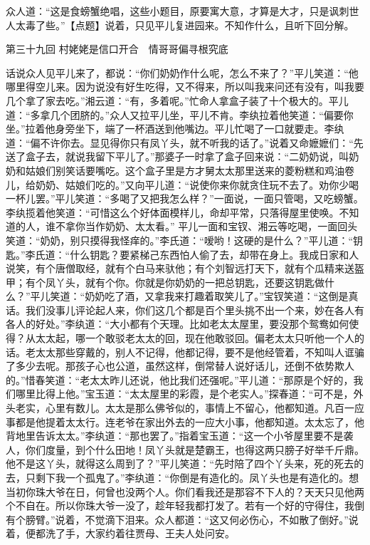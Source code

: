 \documentclass[12pt,oneside]{book}
\begin{document}
众人道：“这是食螃蟹绝唱，这些小题目，原要寓大意，才算是大才，只是讽刺世人太毒了些。”【点题】说着，只见平儿复进园来。不知作什么，且听下回分解。


 
第三十九回  村姥姥是信口开合　情哥哥偏寻根究底


话说众人见平儿来了，都说：“你们奶奶作什么呢，怎么不来了？”平儿笑道：“他哪里得空儿来。因为说没有好生吃得，又不得来，所以叫我来问还有没有，叫我要几个拿了家去吃。”湘云道：“有，多着呢。”忙命人拿盒子装了十个极大的。平儿道：“多拿几个团脐的。”众人又拉平儿坐，平儿不肯。李纨拉着他笑道：“偏要你坐。”拉着他身旁坐下，端了一杯酒送到他嘴边。平儿忙喝了一口就要走。李纨道：“偏不许你去。显见得你只有凤丫头，就不听我的话了。”说着又命嬷嬷们：“先送了盒子去，就说我留下平儿了。”那婆子一时拿了盒子回来说：“二奶奶说，叫奶奶和姑娘们别笑话要嘴吃。这个盒子里是方才舅太太那里送来的菱粉糕和鸡油卷儿，给奶奶、姑娘们吃的。”又向平儿道：“说使你来你就贪住玩不去了。劝你少喝一杯儿罢。”平儿笑道：“多喝了又把我怎么样？”一面说，一面只管喝，又吃螃蟹。李纨揽着他笑道：“可惜这么个好体面模样儿，命却平常，只落得屋里使唤。不知道的人，谁不拿你当作奶奶、太太看。”
平儿一面和宝钗、湘云等吃喝，一面回头笑道：“奶奶，别只摸得我怪痒的。”李氏道：“嗳哟！这硬的是什么？”平儿道：“钥匙。”李氏道：“什么钥匙？要紧梯己东西怕人偷了去，却带在身上。我成日家和人说笑，有个唐僧取经，就有个白马来驮他；有个刘智远打天下，就有个瓜精来送盔甲；有个凤丫头，就有个你。你就是你奶奶的一把总钥匙，还要这钥匙做什么？”平儿笑道：“奶奶吃了酒，又拿我来打趣着取笑儿了。”宝钗笑道：“这倒是真话。我们没事儿评论起人来，你们这几个都是百个里头挑不出一个来，妙在各人有各人的好处。”李纨道：“大小都有个天理。比如老太太屋里，要没那个鸳鸯如何使得？从太太起，哪一个敢驳老太太的回，现在他敢驳回。偏老太太只听他一个人的话。老太太那些穿戴的，别人不记得，他都记得，要不是他经管着，不知叫人诓骗了多少去呢。那孩子心也公道，虽然这样，倒常替人说好话儿，还倒不依势欺人的。”惜春笑道：“老太太昨儿还说，他比我们还强呢。”平儿道：“那原是个好的，我们哪里比得上他。”宝玉道：“太太屋里的彩霞，是个老实人。”探春道：“可不是，外头老实，心里有数儿。太太是那么佛爷似的，事情上不留心，他都知道。凡百一应事都是他提着太太行。连老爷在家出外去的一应大小事，他都知道。太太忘了，他背地里告诉太太。”李纨道：“那也罢了。”指着宝玉道：“这一个小爷屋里要不是袭人，你们度量，到个什么田地！凤丫头就是楚霸王，也得这两只膀子好举千斤鼎。他不是这丫头，就得这么周到了？”平儿笑道：“先时陪了四个丫头来，死的死去的去，只剩下我一个孤鬼了。”李纨道：“你倒是有造化的。凤丫头也是有造化的。想当初你珠大爷在日，何曾也没两个人。你们看我还是那容不下人的？天天只见他两个不自在。所以你珠大爷一没了，趁年轻我都打发了。若有一个好的守得住，我倒有个膀臂。”说着，不觉滴下泪来。众人都道：“这又何必伤心，不如散了倒好。”说着，便都洗了手，大家约着往贾母、王夫人处问安。
\end{document}

